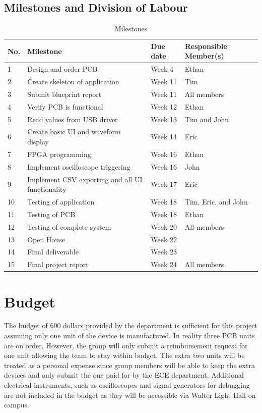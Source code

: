 \documentclass[letterpaper,12pt]{article}
\begin{document}
\subsection{Milestones and Division of Labour}
\begin{table}[h!]
    \caption{Milestones}
    \begin{tabularx}{\textwidth}{l|l|l|l}
        No. & Milestone & Due date & Responsible Member(s) \\
        \hline
        1 & Design and order PCB & Week 4 & Ethan \\
        2 & Create skeleton of application & Week 11 & Tim \\
        3 & Submit blueprint report & Week 11 & All members \\
        4 & Verify PCB is functional & Week 12 & Ethan \\
        5 & Read values from USB driver & Week 13 & Tim and John \\
        6 & Create basic UI and waveform display & Week 14 & Eric \\
        7 & FPGA programming & Week 16 & Ethan \\
        8 & Implement oscilloscope triggering & Week 16 & John \\
        9 & Implement CSV exporting and all UI functionality & Week 17 & Eric \\
        10 & Testing of application & Week 18 & Tim, Eric, and John \\
        11 & Testing of PCB & Week 18 & Ethan \\
        12 & Testing of complete system & Week 20 & All members \\
        13 & Open House & Week 22 & \\
        14 & Final deliverable & Week 23 & \\
        15 & Final project report & Week 24 & All members
    \end{tabularx} 
\label{hw:milestones-table}
\end{table}
\section{Budget} %

The budget of 600 dollars provided by the department is sufficient for this
project assuming only one unit of the device is manufactured. In reality three
PCB units are on order. However, the group will only submit a reimbursement
request for one unit allowing the team to stay within budget. The extra two
units will be treated as a personal expense since group members will be able to
keep the extra devices and only submit the one paid for by the ECE department.
Additional electrical instruments, such as oscilloscopes and signal generators
for debugging are not included in the budget as they will be accessible via
Walter Light Hall on campus.
\end{document}
